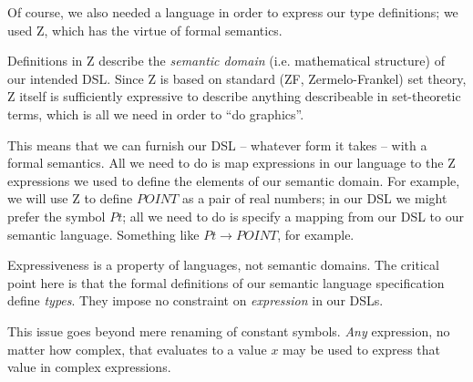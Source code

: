 \documentclass[reqno,12pt]{tufte-handout}
\numberwithin{equation}{subsection}
\numberwithin{equation}{subsection}
\begin{document}
Of course, we also needed a language in order to express our type
definitions; we used Z, which has the virtue of formal semantics.

Definitions in Z describe the \textit{semantic domain}
(i.e. mathematical structure) of our intended DSL.  Since Z is based
on standard (ZF, Zermelo-Frankel) set theory, Z itself is sufficiently
expressive to describe anything describeable in set-theoretic terms,
which is all we need in order to ``do graphics''.

This means that we can furnish our DSL -- whatever form it takes --
with a formal semantics.  All we need to do is map expressions in our
language to the Z expressions we used to define the elements of our
semantic domain.  For example, we will use Z to define \(POINT\) as a
pair of real numbers; in our DSL we might prefer the symbol \(Pt\);
all we need to do is specify a mapping from our DSL to our semantic
language. Something like \(Pt\rightarrow POINT\), for
example.

Expressiveness is a property of languages, not semantic domains.  The
critical point here is that the formal definitions of our semantic
language specification define \textit{types}.  They impose no
constraint on \textit{expression} in our DSLs.

This issue goes beyond mere renaming of constant symbols.
\textit{Any} expression, no matter how complex, that evaluates to a
value $x$ may be used to express that value in complex expressions.

\end{document}
